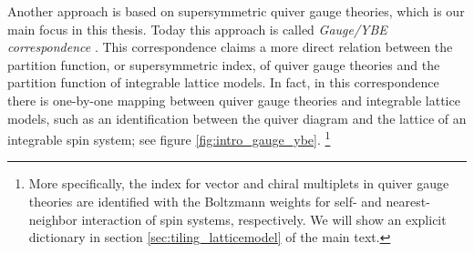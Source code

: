 Another approach is based on supersymmetric quiver gauge theories, which is our main focus in this thesis.
Today this approach is called \emph{Gauge/YBE correspondence} \cite{Yamazaki:2012cp,Terashima:2012cx}.
This correspondence claims a more direct relation between the partition function, or supersymmetric index,
of quiver gauge theories and the partition function of integrable lattice models.
In fact, in this correspondence there is one-by-one mapping
between quiver gauge theories and integrable lattice models,
such as an identification between the quiver diagram and the lattice of an integrable spin system;
see figure \ref{fig:intro_gauge_ybe}.%
%
\footnote{More specifically, the index for vector and chiral multiplets
in quiver gauge theories are identified with the Boltzmann weights for
self- and nearest-neighbor interaction of spin systems, respectively.
We will show an explicit dictionary in section \ref{sec:tiling_latticemodel} of the main text.}
%
%
